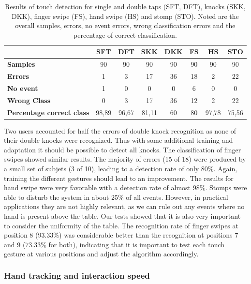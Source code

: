 \begin{table}[htbp]
  \centering
  \caption{Results of touch detection for single and double taps (SFT, DFT), knocks (SKK, DKK), finger swipe (FS), hand swipe (HS) and stomp (STO). Noted are the overall samples, errors, no event errors, wrong classification errors and the percentage of correct classification.}
    \begin{tabular}{lccccccc}
    \toprule
          & \textbf{SFT} & \textbf{DFT} & \textbf{SKK} & \textbf{DKK} & \textbf{FS} & \textbf{HS} & \textbf{STO} \\
    \midrule
    \textbf{Samples} & 90    & 90    & 90    & 90    & 90    & 90    & 90 \\
    \textbf{Errors} & 1     & 3     & 17    & 36    & 18    & 2     & 22 \\
    \textbf{No event} & 1     & 0     & 0     & 0     & 6     & 0     & 0 \\
    \textbf{Wrong Class} & 0     & 3     & 17    & 36    & 12    & 2     & 22 \\
    \textbf{Percentage correct class} & 98,89 & 96,67 & 81,11 & 60    & 80    & 97,78 & 75,56 \\
    \bottomrule
    \end{tabular}%
  \label{tab:prot_captap_eval_knock}%
\end{table}%

Two users accounted for half the errors of double knock recognition as none of their double knocks were recognized. Thus with some additional training and adaptation it should be possible to detect all knocks. The classification of finger swipes showed similar results. The majority of errors (15 of 18) were produced by a small set of subjets (3 of 10), leading to a detection rate of only 80\%. Again, training the different gestures should lead to an improvement. The results for hand swipe were very favorable with a detection rate of almost 98\%. Stomps were able to disturb the system in about 25\% of all events. However, in practical applications they are not highly relevant, as we can rule out any events where no hand is present above the table. Our tests showed that it is also very important to consider the uniformity of the table. The recognition rate of finger swipes at position 8 (93.33\%) was considerable better than the recognition at positions 7 and 9 (73.33\% for both), indicating that it is important to test each touch gesture at various positions and adjust the algorithm accordingly.
\subsubsection*{Hand tracking and interaction speed}

